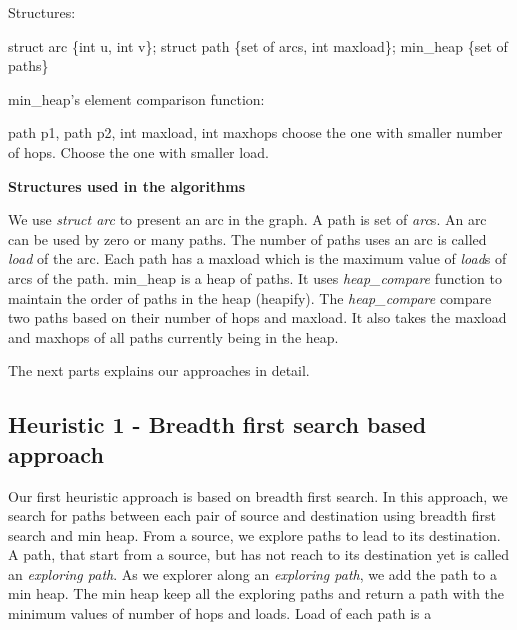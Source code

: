 \begin{algorithm}[!htp]
Structures:
    \begin{algorithmic}
	\State struct arc \{int u, int v\};
	\State struct path \{set of arcs, int maxload\};
	\State min\_heap \{set of paths\}
    \end{algorithmic}

min\_heap's element comparison function:
    \begin{algorithmic}
         {path p1, path p2, int maxload, int maxhops}
                \State choose the one with smaller number of hops.
            \EndIf
                \State Choose the one with smaller load.
            \EndIf
        \EndFunction
    \end{algorithmic}

\caption*{\textbf{Structures used in the algorithms}}
\label{alg:struct1}

\end{algorithm}

We use \textit{struct arc} to present an arc in the graph. A path is set of \textit{arc}s. An arc can be used by zero or many paths. The number of paths uses an arc is called \textit{load} of the arc. Each path has a maxload which is the maximum value of \textit{load}s of arcs of the path. {min\_heap} is a heap of paths. It uses \textit{heap\_compare} function to maintain the order of paths in the heap (heapify). The \textit{heap\_compare} compare two paths based on their number of hops and maxload. It also takes the maxload and maxhops of all paths currently being in the heap. 

The next parts explains our approaches in detail.

\subsection{Heuristic 1 - Breadth first search based approach}

Our first heuristic approach is based on breadth first search. In this approach, we search for paths between each pair of source and destination using breadth first search and min heap. From a source, we explore paths to lead to its destination. A path, that start from a source, but has not reach to its destination yet is called an \textit{exploring path}. As we explorer along an \textit{exploring path}, we add the path to a min heap. The min heap keep all the exploring paths and return a path with the minimum values of number of hops and loads. Load of each path is a 

